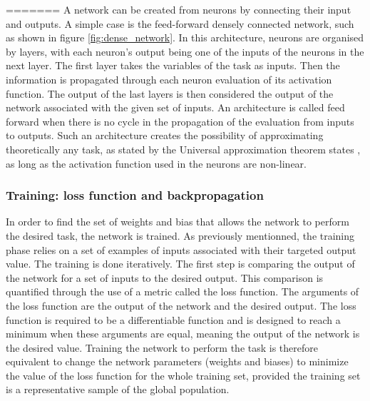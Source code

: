 =======
A network can be created from neurons by connecting their input and outputs. A simple case is the feed-forward densely connected network, such as shown in figure \ref{fig:dense_network}. In this architecture, neurons are organised by layers, with each neuron's output being one of the inputs of the neurons in the next layer. The first layer takes the variables of the task as inputs. Then the information is propagated through each neuron evaluation of its activation function. The output of the last layers is then considered the output of the network associated with the given set of inputs. An architecture is called feed forward when there is no cycle in the propagation of the evaluation from inputs to outputs. Such an architecture creates the possibility of approximating theoretically any task, as stated by the Universal approximation theorem states \cite{Cybenko1989}, as long as the activation function used in the neurons are non-linear.

\subsubsection{Training: loss function and backpropagation}

In order to find the set of weights and bias that allows the network to perform the desired task, the network is trained.
As previously mentionned, the training phase relies on a set of examples of inputs associated with their targeted output value. The training is done iteratively. The first step is comparing the output of the network for a set of inputs to the desired output. This comparison is quantified through the use of a metric called the loss function. The arguments of the loss function are the output of the network and the desired output. The loss function is required to be a differentiable function and is designed to reach a minimum when these arguments are equal, meaning the output of the network is the desired value. Training the network to perform the task is therefore equivalent to change the network parameters (weights and biases) to minimize the value of the loss function for the whole training set, provided the training set is a representative sample of the global population.

